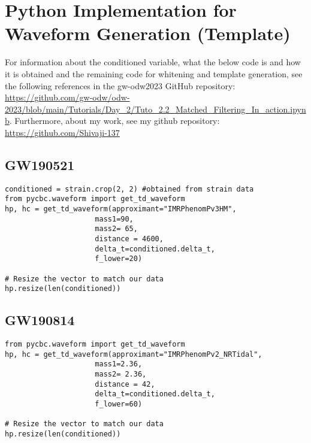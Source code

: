 \section{Python Implementation for Waveform Generation (Template)}
\label{code2}

For information about the conditioned variable, what the below code is and how it is obtained and the remaining code for whitening and template generation, see the following references in the gw-odw2023 GitHub repository: \url{https://github.com/gw-odw/odw-2023/blob/main/Tutorials/Day_2/Tuto_2.2_Matched_Filtering_In_action.ipynb}. Furthermore, about my work, see my github repository: \url{https://github.com/Shivaji-137}
\subsection{GW190521}
\begin{lstlisting}
conditioned = strain.crop(2, 2) #obtained from strain data
from pycbc.waveform import get_td_waveform
hp, hc = get_td_waveform(approximant="IMRPhenomPv3HM",
                     mass1=90,
                     mass2= 65,
                     distance = 4600,
                     delta_t=conditioned.delta_t,
                     f_lower=20)

# Resize the vector to match our data
hp.resize(len(conditioned))
\end{lstlisting}
\subsection{GW190814}
\begin{lstlisting}
from pycbc.waveform import get_td_waveform
hp, hc = get_td_waveform(approximant="IMRPhenomPv2_NRTidal",
                     mass1=2.36,
                     mass2= 2.36,
                     distance = 42,
                     delta_t=conditioned.delta_t,
                     f_lower=60)

# Resize the vector to match our data
hp.resize(len(conditioned))
\end{lstlisting}
 




